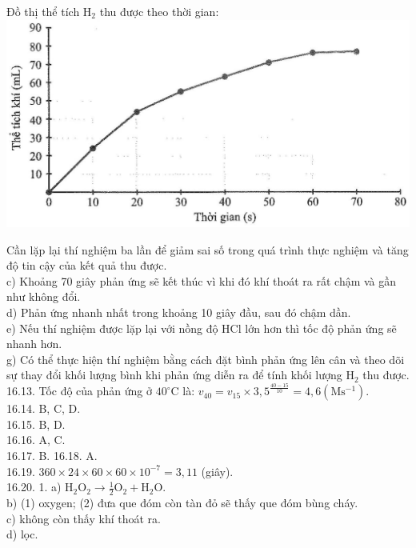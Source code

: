 \documentclass[10pt]{article}
\begin{document}
Đồ thị thể tích $\mathrm{H}_{2}$ thu được theo thời gian:\\
\includegraphics[max width=\textwidth, center]{2025_10_23_baf6b6057fd5ebd09626g-25}

Cần lặp lại thí nghiệm ba lần để giảm sai số trong quá trình thực nghiệm và tăng độ tin cậy của kết quả thu được.\\
c) Khoảng 70 giây phản ứng sẽ kết thúc vì khi đó khí thoát ra rất chậm và gần như không đổi.\\
d) Phản ứng nhanh nhất trong khoảng 10 giây đầu, sau đó chậm dần.\\
e) Nếu thí nghiệm được lặp lại với nồng độ HCl lớn hơn thì tốc độ phản ứng sẽ nhanh hơn.\\
g) Có thể thực hiện thí nghiệm bằng cách đặt bình phản ứng lên cân và theo dõi sự thay đổi khối lượng bình khi phản ứng diễn ra để tính khối lượng $\mathrm{H}_{2}$ thu được.\\
16.13. Tốc độ của phản ứng ở $40^{\circ} \mathrm{C}$ là: $v_{40}=v_{15} \times 3,5^{\frac{40-15}{10}}=4,6\left(\mathrm{M} \mathrm{s}^{-1}\right)$.\\
16.14. B, C, D.\\
16.15. B, D.\\
16.16. A, C.\\
16.17. B. 16.18. A.\\
16.19. $360 \times 24 \times 60 \times 60 \times 10^{-7}=3,11$ (giây).\\
16.20. 1. a) $\mathrm{H}_{2} \mathrm{O}_{2} \rightarrow \frac{1}{2} \mathrm{O}_{2}+\mathrm{H}_{2} \mathrm{O}$.\\
b) (1) oxygen; (2) đưa que đóm còn tàn đỏ sẽ thấy que đóm bùng cháy.\\
c) không còn thấy khí thoát ra.\\
d) lọc.
\end{document}
